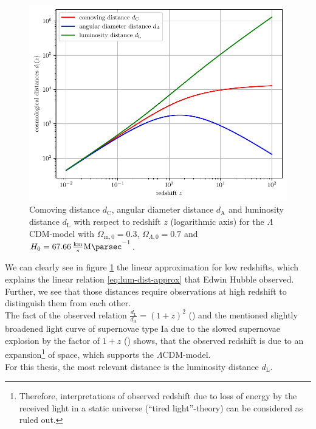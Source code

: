 \begin{figure}[H]
    \centering
    \includegraphics[scale=0.9]{figures/plots/PDF/cosmological-distances_vs_redshift.pdf}
    \caption{Comoving distance $d_{\text{C}}$, angular diameter distance $d_{\text{A}}$ and luminosity distance $d_{\text{L}}$ with respect to redshift $z$ (logarithmic axis) for the $\Lambda$CDM-model with $\Omega_{\text{m},0} = 0.3$, $\Omega_{\Lambda,0} = 0.7$ and $H_{0} = \SI{67.66}{\frac{\kilo \meter}{\second} \mega \parsec^{-1}}$.}
    \label{fig:cosmological-distances-vs-redshift}
\end{figure}

\noindent We can clearly see in figure \ref{fig:cosmological-distances-vs-redshift} the linear approximation for low redshifts, which explains the linear relation \eqref{eq:lum-dist-approx} that Edwin Hubble observed. Further, we see that those distances require observations at high redshift to distinguish them from each other. \\
The fact of the observed relation $\displaystyle \frac{d_{\text{L}}}{d_{\text{A}}} = (1 + z)^2$ (\cite[p.~58]{Weinberg2008}) and the mentioned slightly broadened light curve of supernovae type Ia due to the slowed supernovae explosion by the factor of $1 + z$ (\cite[p.~10/11]{Goldhaber2001}) shows, that the observed redshift is due to an expansion\footnote{Therefore, interpretations of observed redshift due to loss of energy by the received light in a static universe (``tired light''-theory) can be considered as ruled out.} of space, which supports the $\Lambda$CDM-model. \\
\noindent For this thesis, the most relevant distance is the luminosity distance $d_{\text{L}}$.
